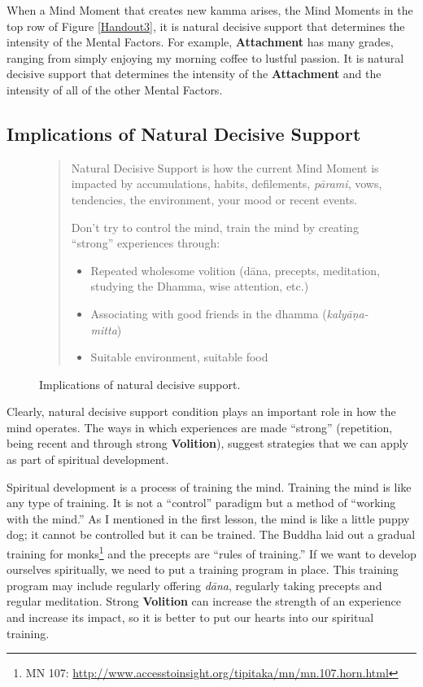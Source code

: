 When a Mind Moment that creates new kamma arises, the Mind Moments in the top row of Figure \ref{Handout3}, it is natural decisive support that determines the intensity of the Mental Factors. For example, \textbf{Attachment} has many grades, ranging from simply enjoying my morning coffee to lustful passion. It is natural decisive support that determines the intensity of the \textbf{Attachment} and the intensity of all of the other Mental Factors.

\subsection*{Implications of Natural Decisive Support}

\begin{figure}[H]
\begin{quotation}
Natural Decisive Support is how the current Mind Moment is impacted by accumulations, habits, defilements, \textit{pārami}, vows, tendencies, the environment, your mood or recent events.

Don’t try to control the mind, train the mind by creating “strong” experiences through:

\begin{itemize}

\item Repeated wholesome volition (dāna, precepts, meditation, studying the Dhamma, wise attention, etc.)

\item Associating with good friends in the dhamma (\textit{kalyāṇa-mitta})

\item Suitable environment, suitable food

\end{itemize}
\end{quotation}
\caption{Implications of natural decisive support.}
\label{fig:Implications}
\end{figure}

Clearly, natural decisive support condition plays an important role in how the mind operates. The ways in which experiences are made “strong” (repetition, being recent and through strong \textbf{Volition}), suggest strategies that we can apply as part of spiritual development.

Spiritual development is a process of training the mind. Training the mind is like any type of training. It is not a “control” paradigm but a method of “working with the mind.” As I mentioned in the first lesson, the mind is like a little puppy dog; it cannot be controlled but it can be trained. The Buddha laid out a gradual training for monks\footnote{MN 107: \url{http://www.accesstoinsight.org/tipitaka/mn/mn.107.horn.html}} and the precepts are “rules of training.” If we want to develop ourselves spiritually, we need to put a training program in place. This training program may include regularly offering \textit{dāna}, regularly taking precepts and regular meditation. Strong \textbf{Volition} can increase the strength of an experience and increase its impact, so it is better to put our hearts into our spiritual training.

